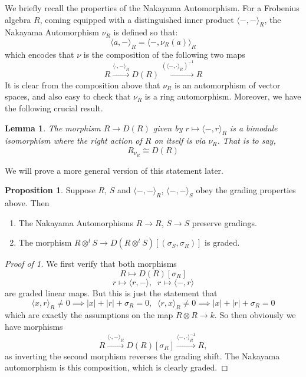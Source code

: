 \documentclass{article}
\theoremstyle{plain}
\newtheorem{lemma}[theorem]{Lemma}
\theoremstyle{definition}
\newtheorem{proposition}[theorem]{Proposition}
\begin{document}
We briefly recall the properties of the Nakayama Automorphism. For a Frobenius algebra $R$, coming equipped with a distinguished inner product $\langle -, - \rangle_R$, the Nakayama Automorphism $\nu_R$ is defined so that:
$$\langle a ,- \rangle_R = \langle -,\nu_R(a) \rangle_R$$
which encodes that $\nu$ is the composition of the following two maps
$$R \xrightarrow{ \langle \cdot , - \rangle_R} D(R) \xrightarrow{ (\langle -, \cdot \rangle_R)^{-1}} R$$
It is clear from the composition above that $\nu_R$ is an automorphism of vector spaces, and also easy to check that $\nu_R$ is a ring automorphism. Moreover, we have the following crucial result.
\begin{lemma} The morphism $R \rightarrow D(R)$ given by $r \mapsto \langle -, r \rangle_R$ is a bimodule isomorphism where the right action of $R$ on itself is via $\nu_R$. That is to say,
$$R_{\nu_R} \cong D(R)$$
\end{lemma}
We will prove a more general version of this statement later. 
\begin{proposition} Suppose $R$, $S$ and $\langle - , - \rangle_R$, $\langle -,- \rangle_S$ obey the grading properties above. Then 
\begin{enumerate} 
\item The Nakayama Automorphisms $R \rightarrow R$, $ S \rightarrow S$ preserve gradings.
\item The morphism $R \otimes^t S \rightarrow D(R\otimes^t S)[(\sigma_S, \sigma_R)]$ is graded.
\end{enumerate} 

\end{proposition}
\begin{proof}[Proof of 1] 

We first verify that both morphisms
$$R \mapsto D(R)[\sigma_R]$$
$$ r \mapsto \langle r, - \rangle, \; \; r \mapsto \langle - , r \rangle$$
are graded linear maps. But this is just the statement that
$$\langle x, r \rangle_R \not=0 \implies |x|+|r|+\sigma_R=0, \;\;  \langle r,x \rangle_R \not=0 \implies |x|+|r|+\sigma_R=0$$
which are exactly the assumptions on the map $R \otimes R \rightarrow k$. So then obviously we have morphisms
$$R \xrightarrow{\langle \cdot, - \rangle_R} D(R)[\sigma_R] \xrightarrow{\langle -, \cdot \rangle_R^{-1}} R,$$
as inverting the second morphism reverses the grading shift. The Nakayama automorphism is this composition, which is clearly graded.
\end{proof}
\end{document}
